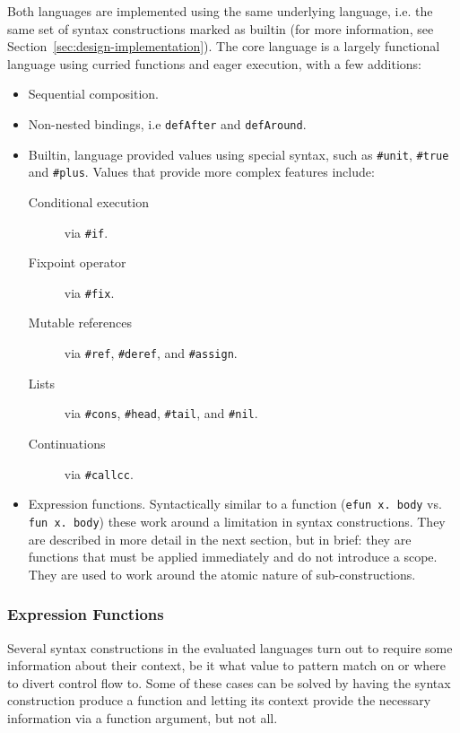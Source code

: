 \documentclass{kththesis}
\begin{document}
Both languages are implemented using the same underlying language, i.e. the same set of syntax constructions marked as builtin (for more information, see Section~\ref{sec:design-implementation}). The core language is a largely functional language using curried functions and eager execution, with a few additions:
\begin{itemize}
  \item Sequential composition.
  \item Non-nested bindings, i.e \texttt{defAfter} and \texttt{defAround}. %
  \item Builtin, language provided values using special syntax, such as \texttt{#unit}, \texttt{#true} and \texttt{#plus}. Values that provide more complex features include:
  \begin{description}
    \item[Conditional execution] via \texttt{#if}.
    \item[Fixpoint operator] via \texttt{#fix}.
    \item[Mutable references] via \texttt{#ref}, \texttt{#deref}, and \texttt{#assign}.
    \item[Lists] via \texttt{#cons}, \texttt{#head}, \texttt{#tail}, and \texttt{#nil}.
    \item[Continuations] via \texttt{#callcc}.
  \end{description}
  \item Expression functions. Syntactically similar to a function (\texttt{efun x. body} vs. \texttt{fun x. body}) these work around a limitation in syntax constructions. They are described in more detail in the next section, but in brief: they are functions that must be applied immediately and do not introduce a scope. They are used to work around the atomic nature of sub-constructions.
\end{itemize}

\subsubsection{Expression Functions} \label{sec:efun-drawbacks}

Several syntax constructions in the evaluated languages turn out to require some information about their context, be it what value to pattern match on or where to divert control flow to. Some of these cases can be solved by having the syntax construction produce a function and letting its context provide the necessary information via a function argument, but not all.
\end{document}
